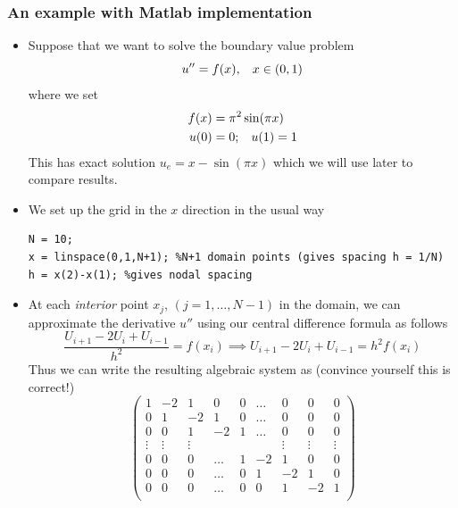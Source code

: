 \documentclass[12pt]{report}
\begin{document}
\subsubsection{An example with Matlab implementation}

\begin{itemize}
\item Suppose that we want to solve the boundary value problem 
\begin{displaymath}
u'' = f(x), \hspace{3mm} x \in (0,1)
\end{displaymath}
where we set
\begin{align*}
f(x) &= \pi^2\sin(\pi x) \\
u(0) &= 0; \hspace{3mm} u(1) = 1
\end{align*}
This has exact solution $u_e = x - \sin(\pi x)$ which we will use later to compare results.
\item We set up the grid in the $x$ direction in the usual way 
\begin{lstlisting}
N = 10; 
x = linspace(0,1,N+1); %N+1 domain points (gives spacing h = 1/N)
h = x(2)-x(1); %gives nodal spacing
\end{lstlisting}
\item At each \textit{interior} point $x_j$, $(j = 1,\ldots,N-1)$ in the domain, we can approximate the derivative $u''$ using our central difference formula as follows
\begin{displaymath}
\frac{U_{i+1} - 2U_i + U_{i-1}}{h^2} = f(x_i) \implies U_{i+1} - 2U_i + U_{i-1} = h^2f(x_i)
\end{displaymath}
Thus we can write the resulting algebraic system as (convince yourself this is correct!)
\begin{displaymath}
\left(\begin{matrix}
  1 & -2 & 1 & 0 & 0 & \ldots & 0 & 0 & 0 \\
  0 & 1 & -2 & 1 & 0 & \ldots & 0 & 0 & 0 \\
  0 & 0 & 1 & -2 & 1 & \ldots & 0 & 0 & 0 \\
  \vdots & \vdots & \vdots &  &  & & \vdots & \vdots & \vdots \\
  0 & 0 & 0 & \ldots & 1 & -2 & 1 & 0 & 0 \\
  0 & 0 & 0 & \ldots & 0 & 1 & -2 & 1 & 0 \\
  0 & 0 & 0 & \ldots & 0 & 0 & 1 & -2 & 1 \\
 \end{matrix}\right)

\end{displaymath}
\end{itemize}
\end{document}
